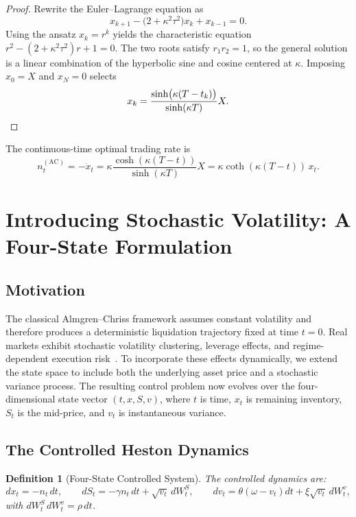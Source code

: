 \documentclass[11pt]{article}
\newtheorem{definition}[theorem]{Definition}
\begin{document}
\begin{proof}
Rewrite the Euler--Lagrange equation as
\[
x_{k+1} - \bigl(2 + \kappa^2\tau^2\bigr)x_k + x_{k-1} = 0.
\]
Using the ansatz $x_k = r^k$ yields the characteristic equation $r^2 - (2+\kappa^2\tau^2)r + 1 = 0$.
The two roots satisfy $r_1 r_2 = 1$, so the general solution is a linear combination of the
hyperbolic sine and cosine centered at $\kappa$. Imposing $x_0 = X$ and $x_N = 0$ selects
\[
x_k = \frac{\sinh\bigl(\kappa(T-t_k)\bigr)}{\sinh(\kappa T)}X. \qedhere
\]
\end{proof}

The continuous-time optimal trading rate is
\[
n_t^{(\mathrm{AC})} = -\dot{x}_t
= \kappa\frac{\cosh(\kappa(T-t))}{\sinh(\kappa T)}X
= \kappa\coth(\kappa(T-t))\,x_t.
\]

\section{Introducing Stochastic Volatility: A Four-State Formulation}

\subsection{Motivation}

The classical Almgren--Chriss framework assumes constant volatility and therefore produces a
deterministic liquidation trajectory fixed at time $t=0$.
Real markets exhibit stochastic volatility clustering, leverage effects, and regime-dependent
execution risk~\cite{engle1982arch,black1976studies}.
To incorporate these effects dynamically, we extend the state space to include both the underlying
asset price and a stochastic variance process. The resulting control problem now evolves over the
four-dimensional state vector $(t, x, S, v)$, where $t$ is time, $x_t$ is remaining inventory,
$S_t$ is the mid-price, and $v_t$ is instantaneous variance.

\subsection{The Controlled Heston Dynamics}

\begin{definition}[Four-State Controlled System]
The controlled dynamics are:
\[
dx_t = -n_t\,dt, \qquad
dS_t = -\gamma n_t\,dt + \sqrt{v_t}\,dW_t^S, \qquad
dv_t = \theta(\omega-v_t)dt + \xi\sqrt{v_t}\,dW_t^v,
\]
with $dW_t^S\,dW_t^v = \rho\,dt$.
\end{definition}
\end{document}
